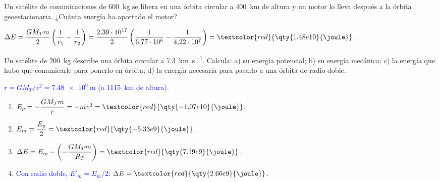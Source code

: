 \begin{exercise}
    Un satélite de comunicaciones de \qty{600}{\kg} se libera en una órbita circular a \qty{400}{\km} de altura y un motor lo
    lleva después a la órbita geoestacionaria. ¿Cuánta energía ha aportado el motor?
    \begin{solu}
        \(\Delta E = \dfrac{G M_T m}{2}\left(\dfrac{1}{r_1} - \dfrac{1}{r_2}\right) = \dfrac{2{,}39\cdot 10^{17}}{2}\left(\dfrac{1}{6{,}77\cdot 10^6} - \dfrac{1}{4{,}22\cdot 10^7}\right) = \textcolor{red}{\qty{1.48e10}{\joule}}\).
    \end{solu}
\end{exercise}

\begin{exercise}
    Un satélite de \qty{200}{\kg} describe una órbita circular a \qty{7.3}{\km\per\second}. Calcula: a) su energía potencial;
    b) su energía mecánica; c) la energía que hubo que comunicarle para ponerlo en órbita; d) la energía necesaria para pasarlo
    a una órbita de radio doble.
    \begin{solu}
        \textcolor{blue}{\(r = G M_T/v^2 = \qty{7.48e6}{\m}\) (a \qty{1115}{\km} de altura).}
        \begin{enumerate}[label=\letraminuscula]
            \item \(E_p = -\dfrac{G M_T m}{r} = -m v^2 = \textcolor{red}{\qty{-1.07e10}{\joule}}\).
            \item \(E_m = \dfrac{E_p}{2} = \textcolor{red}{\qty{-5.33e9}{\joule}}\).
            \item \(\Delta E = E_m - \left(-\dfrac{G M_T m}{R_T}\right) = \textcolor{red}{\qty{7.19e9}{\joule}}\).
            \item \textcolor{blue}{Con radio doble, \(E'_m = E_m/2\):} \(\Delta E = \textcolor{red}{\qty{2.66e9}{\joule}}\).
        \end{enumerate}
    \end{solu}
\end{exercise}

